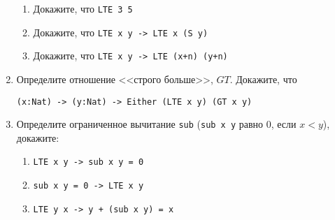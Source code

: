 \documentclass[10pt,a4paper,oneside]{article}
\begin{document}
\begin{enumerate}
\begin{enumerate}
\item Докажите, что \verb!LTE 3 5!
\item Докажите, что \verb!LTE x y -> LTE x (S y)!
\item Докажите, что \verb!LTE x y -> LTE (x+n) (y+n)!
\end{enumerate}

\item Определите отношение <<строго больше>>, $GT$. Докажите, что

\verb!(x:Nat) -> (y:Nat) -> Either (LTE x y) (GT x y)!

\item Определите ограниченное вычитание \verb!sub! (\verb!sub x y! равно 0, если $x < y$), 
докажите:
\begin{enumerate}
\item \verb!LTE x y -> sub x y = 0!
\item \verb!sub x y = 0 -> LTE x y!
\item \verb!LTE y x -> y + (sub x y) = x!
\end{enumerate}

\end{enumerate}
\end{document}
